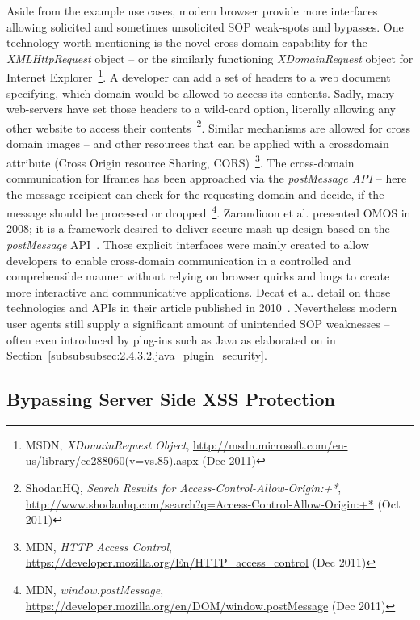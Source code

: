     Aside from the example use cases, modern browser provide more interfaces allowing solicited and sometimes unsolicited SOP weak-spots and bypasses. One technology worth mentioning is the novel cross-domain capability for the \textit{XMLHttpRequest} object -- or the similarly functioning \textit{XDomainRequest} object for Internet Explorer~\footnote{MSDN, \textit{XDomainRequest Object}, \url{http://msdn.microsoft.com/en-us/library/cc288060(v=vs.85).aspx} (Dec 2011)}. A developer can add a set of headers to a web document specifying, which domain would be allowed to access its contents. Sadly, many web-servers have set those headers to a wild-card option, literally allowing any other website to access their contents~\footnote{ShodanHQ, \textit{Search Results for Access-Control-Allow-Origin:+*}, \url{http://www.shodanhq.com/search?q=Access-Control-Allow-Origin:+*} (Oct 2011)}. Similar mechanisms are allowed for cross domain images -- and other resources that can be applied with a crossdomain attribute (Cross 
Origin resource Sharing, CORS)~\footnote{MDN, \textit{HTTP Access Control}, \url{https://developer.mozilla.org/En/HTTP_access_control} (Dec 2011)}. The cross-domain communication for Iframes has been approached via the \textit{postMessage API} -- here the message recipient can check for the requesting domain and decide, if the message should be processed or dropped~\footnote{MDN, \textit{window.postMessage}, \url{https://developer.mozilla.org/en/DOM/window.postMessage} (Dec 2011)}. Zarandioon et al. presented OMOS in 2008; it is a framework desired to deliver secure mash-up design based on the \textit{postMessage} API~\cite{zarandioon2008omos}. Those explicit interfaces were mainly created to allow developers to enable cross-domain communication in a controlled and comprehensible manner without relying on browser quirks and bugs to create more interactive and communicative applications. Decat et al. detail on those technologies and APIs in their article published in 2010~\cite{decat2010towards}. Nevertheless 
modern user agents still supply a significant amount of unintended SOP weaknesses -- often even introduced by plug-ins such as Java as elaborated on in Section~\ref{subsubsubsec:2.4.3.2.java_plugin_security}.
        

    \subsection{Bypassing Server Side XSS Protection}
    \label{subsubsec:5.4.6.bypassing_server_side_xss_protection}

